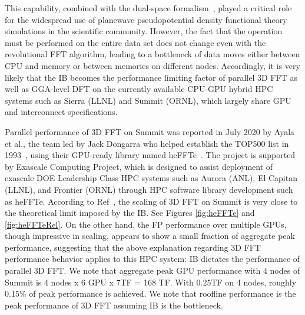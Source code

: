 This capability, combined with the dual-space formalism~\cite{Martin1988}, played a critical role for the widespread use of planewave pseudopotential density functional theory simulations in the scientific community. However, the fact that the operation must be performed on the entire data set does not change even with the revolutional FFT algorithm, leading to a bottleneck of data moves either between CPU and memory or between memories on different nodes. Accordingly, it is very likely that the IB becomes the performance limiting factor of parallel 3D FFT as well as GGA-level DFT on the currently available CPU-GPU hybrid HPC systems such as Sierra (LLNL) and Summit (ORNL), which largely share GPU and interconnect specifications. 

Parallel performance of 3D FFT on Summit was reported in July 2020 by Ayala et al., the team led by Jack Dongarra who helped establish the TOP500 list in 1993~\cite{dongarra500}, using their GPU-ready library named heFFTe~\cite{heFFTe2020}. The project is supported by Exascale Computing Project, which is designed to assist deployment of exascale DOE Leadership Class HPC systems such as Aurora (ANL), El Capitan (LLNL), and Frontier (ORNL) through HPC software library development such as heFFTe. According to Ref~\cite{heFFTe2020}, the scaling of 3D FFT on Summit is very close to the theoretical limit imposed by the IB. See Figures \ref{fig:heFFTe} and \ref{fig:heFFTeRel}. On the other hand, the FP performance over multiple GPUs, though impressive in scaling, appears to show a small fraction of aggregate peak performance, suggesting that the above explanation regarding 3D FFT performance behavior applies to this HPC system: IB dictates the performance of parallel 3D FFT. We note that aggregate peak GPU performance with 4 nodes of Summit is 4 nodes x 6 GPU x 7TF = 168 TF. With 0.25TF on 4 nodes, roughly 0.15\% of peak performance is achieved. We note that roofline performance is the peak performance of 3D FFT assuming IB is the bottleneck. 

